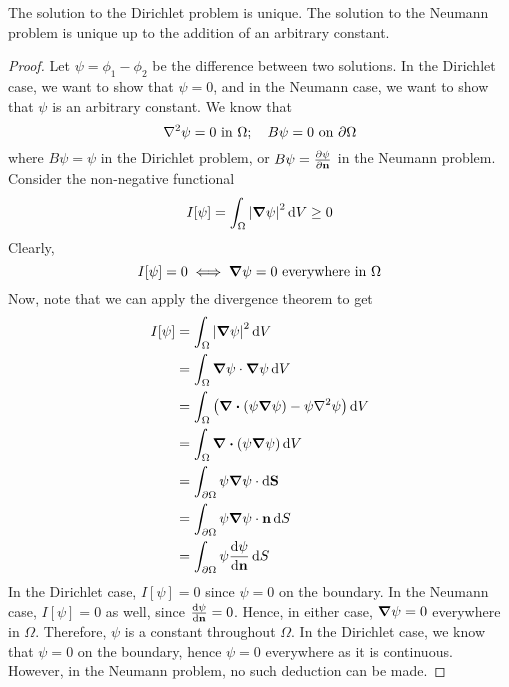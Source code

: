 \documentclass{article}
\begin{document}
\begin{proposition}
    The solution to the Dirichlet problem is unique. The solution to the Neumann problem is unique up to the addition of an arbitrary constant.
\end{proposition}
\begin{proof}
    Let $\psi = \phi_1 - \phi_2$ be the difference between two solutions. In the Dirichlet case, we want to show that $\psi = 0$, and in the Neumann case, we want to show that $\psi$ is an arbitrary constant. We know that
    \[ \laplacian{\psi} = 0 \text{ in } \Omega;\quad B\psi = 0 \text{ on } \partial\Omega \]
    where $B\psi = \psi$ in the Dirichlet problem, or $B\psi = \pdv{\psi}{\vb n}$ in the Neumann problem. Consider the non-negative functional
    \[ I[\psi] = \int_\Omega \abs{\grad{\psi}}^2 \dd{V} \geq 0 \]
    Clearly,
    \[ I[\psi] = 0 \iff \grad{\psi} = 0 \text{ everywhere in } \Omega \]
    Now, note that we can apply the divergence theorem to get
    \begin{align*}
        I[\psi] & = \int_\Omega \abs{\grad{\psi}}^2 \dd{V}                                          \\
                & = \int_\Omega \grad{\psi} \cdot \grad{\psi} \dd{V}                                \\
                & = \int_\Omega \left( \div(\psi \grad{\psi}) - \psi\laplacian{\psi} \right) \dd{V} \\
                & = \int_\Omega \div(\psi \grad{\psi}) \dd{V}                                       \\
                & = \int_{\partial\Omega} \psi \grad{\psi} \cdot\dd{\vb S}                          \\
                & = \int_{\partial\Omega} \psi \grad{\psi} \cdot \vb n \dd{S}                       \\
                & = \int_{\partial\Omega} \psi \dv{\psi}{\vb n} \dd{S}                              \\
    \end{align*}
    In the Dirichlet case, $I[\psi] = 0$ since $\psi = 0$ on the boundary. In the Neumann case, $I[\psi] = 0$ as well, since $\dv{\psi}{\vb n} = 0$. Hence, in either case, $\grad{\psi} = 0$ everywhere in $\Omega$. Therefore, $\psi$ is a constant throughout $\Omega$. In the Dirichlet case, we know that $\psi = 0$ on the boundary, hence $\psi = 0$ everywhere as it is continuous. However, in the Neumann problem, no such deduction can be made.
\end{proof}
\end{document}
